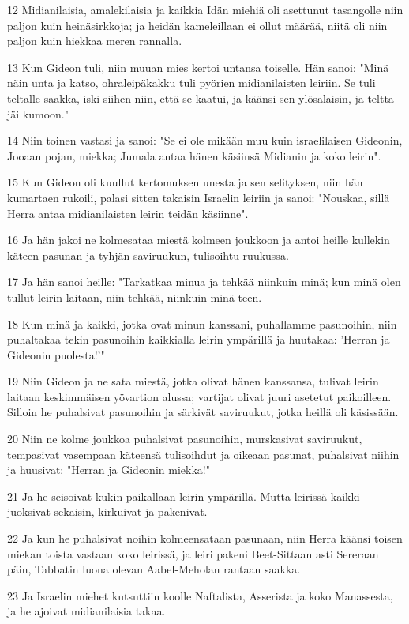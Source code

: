 \par 12 Midianilaisia, amalekilaisia ja kaikkia Idän miehiä oli asettunut tasangolle niin paljon kuin heinäsirkkoja; ja heidän kameleillaan ei ollut määrää, niitä oli niin paljon kuin hiekkaa meren rannalla.
\par 13 Kun Gideon tuli, niin muuan mies kertoi untansa toiselle. Hän sanoi: "Minä näin unta ja katso, ohraleipäkakku tuli pyörien midianilaisten leiriin. Se tuli teltalle saakka, iski siihen niin, että se kaatui, ja käänsi sen ylösalaisin, ja teltta jäi kumoon."
\par 14 Niin toinen vastasi ja sanoi: "Se ei ole mikään muu kuin israelilaisen Gideonin, Jooaan pojan, miekka; Jumala antaa hänen käsiinsä Midianin ja koko leirin".
\par 15 Kun Gideon oli kuullut kertomuksen unesta ja sen selityksen, niin hän kumartaen rukoili, palasi sitten takaisin Israelin leiriin ja sanoi: "Nouskaa, sillä Herra antaa midianilaisten leirin teidän käsiinne".
\par 16 Ja hän jakoi ne kolmesataa miestä kolmeen joukkoon ja antoi heille kullekin käteen pasunan ja tyhjän saviruukun, tulisoihtu ruukussa.
\par 17 Ja hän sanoi heille: "Tarkatkaa minua ja tehkää niinkuin minä; kun minä olen tullut leirin laitaan, niin tehkää, niinkuin minä teen.
\par 18 Kun minä ja kaikki, jotka ovat minun kanssani, puhallamme pasunoihin, niin puhaltakaa tekin pasunoihin kaikkialla leirin ympärillä ja huutakaa: 'Herran ja Gideonin puolesta!'"
\par 19 Niin Gideon ja ne sata miestä, jotka olivat hänen kanssansa, tulivat leirin laitaan keskimmäisen yövartion alussa; vartijat olivat juuri asetetut paikoilleen. Silloin he puhalsivat pasunoihin ja särkivät saviruukut, jotka heillä oli käsissään.
\par 20 Niin ne kolme joukkoa puhalsivat pasunoihin, murskasivat saviruukut, tempasivat vasempaan käteensä tulisoihdut ja oikeaan pasunat, puhalsivat niihin ja huusivat: "Herran ja Gideonin miekka!"
\par 21 Ja he seisoivat kukin paikallaan leirin ympärillä. Mutta leirissä kaikki juoksivat sekaisin, kirkuivat ja pakenivat.
\par 22 Ja kun he puhalsivat noihin kolmeensataan pasunaan, niin Herra käänsi toisen miekan toista vastaan koko leirissä, ja leiri pakeni Beet-Sittaan asti Sereraan päin, Tabbatin luona olevan Aabel-Meholan rantaan saakka.
\par 23 Ja Israelin miehet kutsuttiin koolle Naftalista, Asserista ja koko Manassesta, ja he ajoivat midianilaisia takaa.
